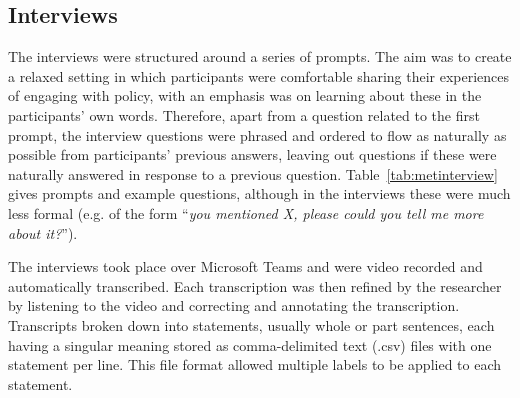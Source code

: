 \subsection{Interviews}\label{sec:metinterview}

The interviews were structured around a series of prompts. The aim was to create a relaxed setting in which participants were comfortable sharing their experiences of engaging with policy, with an emphasis was on learning about these in the participants' own words. Therefore, apart from a question related to the first prompt, the interview questions were phrased and ordered to flow as naturally as possible from participants' previous answers, leaving out questions if these were naturally answered in response to a previous question. Table~\ref{tab:metinterview} gives prompts and example questions, although in the interviews these were much less formal (e.g. of the form ``\textit{you mentioned X, please could you tell me more about it?}'').

The interviews took place over Microsoft Teams and were video recorded and automatically transcribed. Each transcription was then refined by the researcher by listening to the video and correcting and annotating the transcription. Transcripts broken down into statements, usually whole or part sentences, each having a singular meaning stored as comma-delimited text (.csv) files with one statement per line. This file format allowed multiple labels to be applied to each statement.


